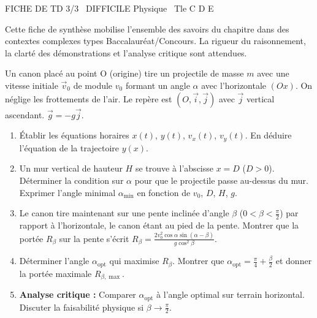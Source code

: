 \documentclass[11pt]{article}
\begin{document}
\begin{tcolorbox}[enhanced,colback=popink,colframe=popink,arc=10pt,boxrule=0pt,left=12pt,right=12pt,top=9pt,bottom=9pt]
{\color{white}\popxbold\small FICHE DE TD 3/3 \textbullet\ DIFFICILE \hfill Physique \textbullet\ Tle C D E\par}
\end{tcolorbox}
\vspace{4pt}
Cette fiche de synthèse mobilise l'ensemble des savoirs du chapitre dans des contextes complexes types Baccalauréat/Concours. La rigueur du raisonnement, la clarté des démonstrations et l'analyse critique sont attendues.

\begin{exercice}
Un canon placé au point O (origine) tire un projectile de masse $m$ avec une vitesse initiale $\vec{v}_0$ de module $v_0$ formant un angle $\alpha$ avec l'horizontale $(Ox)$. On néglige les frottements de l'air. Le repère est $(O, \vec{i}, \vec{j})$ avec $\vec{j}$ vertical ascendant. $\vec{g} = -g\vec{j}$.
\begin{enumerate}
    \item Établir les équations horaires $x(t)$, $y(t)$, $v_x(t)$, $v_y(t)$. En déduire l'équation de la trajectoire $y(x)$.
    \item Un mur vertical de hauteur $H$ se trouve à l'abscisse $x = D$ ($D > 0$). Déterminer la condition sur $\alpha$ pour que le projectile passe au-dessus du mur. Exprimer l'angle minimal $\alpha_{\min}$ en fonction de $v_0$, $D$, $H$, $g$.
    \item Le canon tire maintenant sur une pente inclinée d'angle $\beta$ ($0 < \beta < \frac{\pi}{2}$) par rapport à l'horizontale, le canon étant au pied de la pente. Montrer que la portée $R_\beta$ sur la pente s'écrit $R_\beta = \frac{2v_0^2 \cos\alpha \sin(\alpha-\beta)}{g\cos^2\beta}$.
    \item Déterminer l'angle $\alpha_{\text{opt}}$ qui maximise $R_\beta$. Montrer que $\alpha_{\text{opt}} = \frac{\pi}{4} + \frac{\beta}{2}$ et donner la portée maximale $R_{\beta,\max}$.
    \item \textbf{Analyse critique :} Comparer $\alpha_{\text{opt}}$ à l'angle optimal sur terrain horizontal. Discuter la faisabilité physique si $\beta \to \frac{\pi}{2}$.
\end{enumerate}
\end{exercice}
\end{document}
